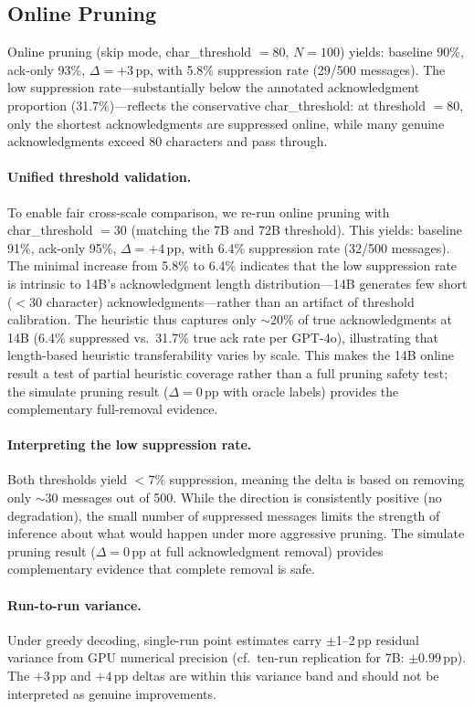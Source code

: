 \subsection{Online Pruning}

Online pruning (skip mode, char\_threshold $= 80$, $N = 100$) yields: baseline 90\%, ack-only 93\%, $\Delta = +3$\,pp, with 5.8\% suppression rate (29/500 messages). The low suppression rate---substantially below the annotated acknowledgment proportion (31.7\%)---reflects the conservative char\_threshold: at threshold $= 80$, only the shortest acknowledgments are suppressed online, while many genuine acknowledgments exceed 80 characters and pass through.

\paragraph{Unified threshold validation.} To enable fair cross-scale comparison, we re-run online pruning with char\_threshold $= 30$ (matching the 7B and 72B threshold). This yields: baseline 91\%, ack-only 95\%, $\Delta = +4$\,pp, with 6.4\% suppression rate (32/500 messages). The minimal increase from 5.8\% to 6.4\% indicates that the low suppression rate is intrinsic to 14B's acknowledgment length distribution---14B generates few short ($< 30$ character) acknowledgments---rather than an artifact of threshold calibration. The heuristic thus captures only ${\sim}$20\% of true acknowledgments at 14B (6.4\% suppressed vs.\ 31.7\% true ack rate per GPT-4o), illustrating that length-based heuristic transferability varies by scale. This makes the 14B online result a test of partial heuristic coverage rather than a full pruning safety test; the simulate pruning result ($\Delta = 0$\,pp with oracle labels) provides the complementary full-removal evidence.

\paragraph{Interpreting the low suppression rate.} Both thresholds yield $< 7\%$ suppression, meaning the delta is based on removing only ${\sim}30$ messages out of 500. While the direction is consistently positive (no degradation), the small number of suppressed messages limits the strength of inference about what would happen under more aggressive pruning. The simulate pruning result ($\Delta = 0$\,pp at full acknowledgment removal) provides complementary evidence that complete removal is safe.

\paragraph{Run-to-run variance.} Under greedy decoding, single-run point estimates carry $\pm$1--2\,pp residual variance from GPU numerical precision (cf.\ ten-run replication for 7B: $\pm 0.99$\,pp). The $+3$\,pp and $+4$\,pp deltas are within this variance band and should not be interpreted as genuine improvements.

